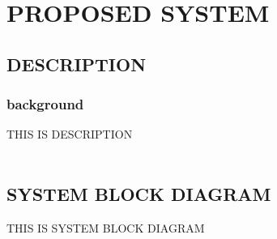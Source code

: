 	\newpage
	
\section{PROPOSED SYSTEM}
\subsection{DESCRIPTION}
\subsubsection{background}
THIS IS DESCRIPTION \\ \\
\pagebreak
\subsection{SYSTEM BLOCK DIAGRAM}
THIS IS SYSTEM BLOCK DIAGRAM
